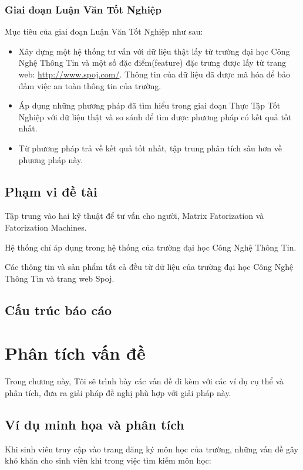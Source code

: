 \documentclass[a4paper,12pt,numbered,print,index,custombib, oneside, custommargin]{report}
\begin{document}
\subsection{Giai đoạn Luận Văn Tốt Nghiệp}
Mục tiêu của giai đoạn Luận Văn Tốt Nghiệp như sau:
\begin{itemize}
\item Xây dựng một hệ thống tư vấn với dữ liệu thật lấy từ trường đại học Công Nghệ Thông Tin và một số đặc điểm(feature) đặc trưng được lấy từ trang web: \href{http://www.spoj.com/}{http://www.spoj.com/}. Thông tin của dữ liệu đã được mã hóa để bảo đảm việc an toàn thông tin của trường.

\item Áp dụng những phương pháp đã tìm hiểu trong giai đoạn Thực Tập Tốt Nghiệp với dữ liệu thật và so sánh để tìm được phương pháp có kết quả tốt nhất.
																															
\item Từ phương pháp trả về kết quả tốt nhất, tập trung phân tích sâu hơn về phương pháp này.

\end{itemize}

\section{Phạm vi đề tài}
Tập trung vào hai kỹ thuật để tư vấn cho người, Matrix Fatorization và Fatorization Machines. 
 
Hệ thống chỉ áp dụng trong hệ thống của trường đại học Công Nghệ Thông Tin.

Các thông tin và sản phẩm tất cả đều từ dữ liệu của trường đại học Công Nghệ Thông Tin và trang web Spoj.

\section{Cấu trúc báo cáo}
%
%
\pagebreak

\chapter{Phân tích vấn đề}

Trong chương này, Tôi sẽ trình bày các vấn đề đi kèm với các ví dụ cụ thể và phân tích, đưa ra giải pháp đề nghị phù hợp với giải pháp này.

\section{Ví dụ minh họa và phân tích}
Khi sinh viên truy cập vào trang đăng ký môn học của trường, những vấn đề gây khó khăn cho sinh viên khi trong việc tìm kiếm môn học:
\end{document}
